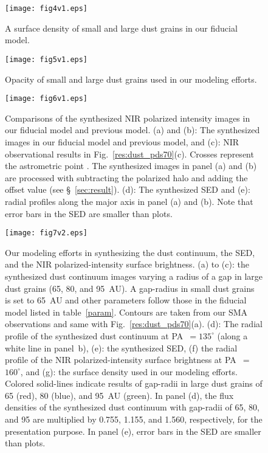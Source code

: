 \documentclass[apj]{emulateapj-rtx4}
\begin{document}
\clearpage

 \begin{figure}
   \centering
   \texttt{[image: fig4v1.eps]}
   \caption{
     A surface density of small and large dust grains in our fiducial model.
   }\label{density}
 \end{figure}

\clearpage

 \begin{figure}
   \centering
   \texttt{[image: fig5v1.eps]}
   \caption{
     Opacity of small and large dust grains used in our modeling efforts.
   }\label{opacity}
 \end{figure}

\clearpage

 \begin{figure}
   \centering
   \texttt{[image: fig6v1.eps]}
   \caption{
     Comparisons of the synthesized NIR polarized intensity images in our fiducial model and previous model.
     (a) and (b): The synthesized images in our fiducial model and previous model, and (c): NIR observational results 
     in Fig.~\ref{res:dust_pds70}(c). Crosses represent the astrometric point
     \citep[14:08:10.125, $-$41:23:52.81;][]{cutr13}. The synthesized images in panel (a) and (b) are processed
     with subtracting the polarized halo and adding the offset value (see \S~\ref{sec:result}).
     (d): The synthesized SED and (e): radial profiles along the major axis in panel (a) and (b).
     Note that error bars in the SED are smaller than plots.
   }\label{comparison}
 \end{figure}

\clearpage

 \begin{figure}
   \centering
   \texttt{[image: fig7v2.eps]}
   \caption{
     Our modeling efforts in synthesizing the dust continuum, the SED, and the NIR polarized-intensity surface brightness.
     (a) to (c): the synthesized dust continuum images varying a radius of a gap in large dust grains (65, 80, and 95~AU).
     A gap-radius in small dust grains is set to 65~AU and other parameters follow those in the fiducial model listed 
     in table~\ref{param}. Contours are taken from our SMA observations and same with Fig.~\ref{res:dust_pds70}(a).
     (d): The radial profile of the synthesized dust continuum at PA~$=$$135^{\circ}$ (along a white line in panel~b),
     (e): the synthesized SED, (f) the radial profile of the NIR polarized-intensity surface brightness at PA~$=$$160^{\circ}$, and
     (g): the surface density used in our modeling efforts. 
     Colored solid-lines indicate results of gap-radii in large dust grains of 65 (red), 80 (blue), and 95~AU (green).
     In panel (d), the flux densities of the synthesized dust continuum with gap-radii of 65, 80, and 95 are
     multiplied by 0.755, 1.155, and 1.560, respectively, for the presentation purpose.
     In panel (e), error bars in the SED are smaller than plots.
   }\label{res:model_pds70}
 \end{figure}
\end{document}
